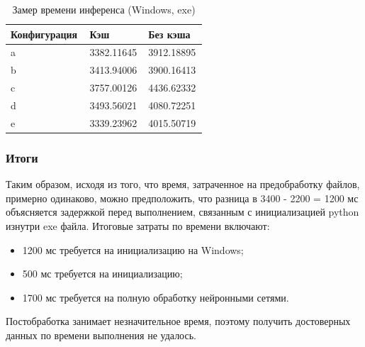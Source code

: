 \begin{table}[h]
\centering
\small
\begin{tabular}{|p{0.25\linewidth}|p{0.15\linewidth}|p{0.15\linewidth}|}
\hline
Конфигурация & {Кэш} & {Без кэша} \\
\hline
a & 3382.11645 & 3912.18895 \\
b & 3413.94006 & 3900.16413 \\
c & 3757.00126 & 4436.62332 \\
d & 3493.56021 & 4080.72251 \\
e & 3339.23962 & 4015.50719 \\
\hline
\end{tabular}
\caption{Замер времени инференса (Windows, exe)}
\label{tab:time-inference-windows}
\end{table}

\subsubsection{Итоги}

Таким образом, исходя из того, что время, затраченное на предобработку файлов, примерно одинаково, можно предположить, что разница в 3400 - 2200 = 1200 мс объясняется задержкой перед выполнением, связанным с инициализацией python изнутри exe файла. Итоговые затраты по времени включают:

\begin{itemize}
    \item 1200 мс требуется на инициализацию на Windows;
    \item 500 мс требуется на инициализацию;
    \item 1700 мс требуется на полную обработку нейронными сетями.
\end{itemize}

Постобработка занимает незначительное время, поэтому получить достоверных данных по времени выполнения не удалось.

